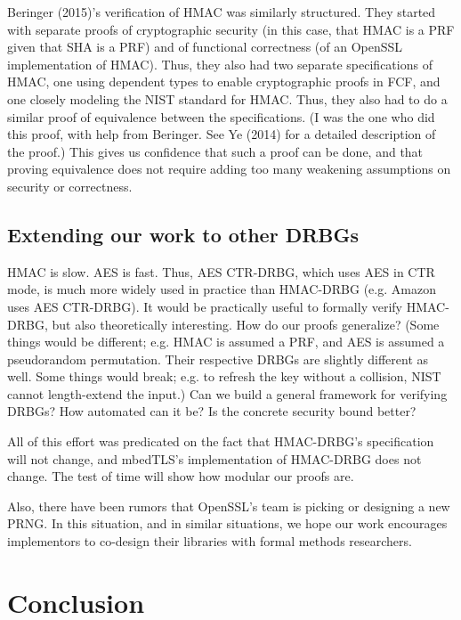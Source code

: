 \documentclass[12pt,lot, lof]{puthesis}
\begin{document}
{Beringer (2015)'s verification of HMAC was similarly structured. They started with separate proofs of cryptographic security (in this case, that HMAC is a PRF given that SHA is a PRF) and of functional correctness (of an OpenSSL implementation of HMAC). Thus, they also had two separate specifications of HMAC, one using dependent types to enable cryptographic proofs in FCF, and one closely modeling the NIST standard for HMAC. Thus, they also had to do a similar proof of equivalence between the specifications. (I was the one who did this proof, with help from Beringer. See Ye (2014) for a detailed description of the proof.) This gives us confidence that such a proof can be done, and that proving equivalence does not require adding too many weakening assumptions on security or correctness. 

\section{Extending our work to other DRBGs} \label{sec:extending_our_work_to_other_drbgs}

HMAC is slow. AES is fast. Thus, AES CTR-DRBG, which uses AES in CTR mode, is much more widely used in practice than HMAC-DRBG (e.g. Amazon uses AES CTR-DRBG). It would be practically useful to formally verify HMAC-DRBG, but also theoretically interesting. How do our proofs generalize? (Some things would be different; e.g. HMAC is assumed a PRF, and AES is assumed a pseudorandom permutation. Their respective DRBGs are slightly different as well. Some things would break; e.g. to refresh the key without a collision, NIST cannot length-extend the input.) Can we build a general framework for verifying DRBGs? How automated can it be? Is the concrete security bound better?

All of this effort was predicated on the fact that HMAC-DRBG's specification will not change, and mbedTLS's implementation of HMAC-DRBG does not change. The test of time will show how modular our proofs are.

Also, there have been rumors that OpenSSL's team is picking or designing a new PRNG. In this situation, and in similar situations, we hope our work encourages implementors to co-design their libraries with formal methods researchers.

\chapter{Conclusion} \label{sec:conclusion}

}
\end{document}
